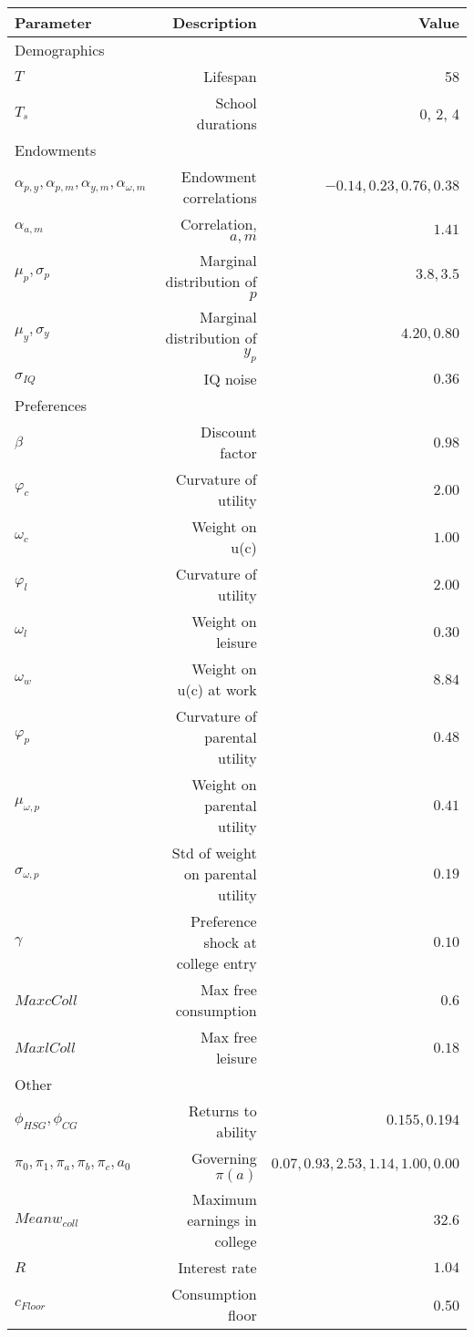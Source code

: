 \begin{tabular}{lrr}
\hline
Parameter & Description  & Value  \\ 
\hline
Demographics &   &   \\ 
$T$ & Lifespan  & 58  \\ 
$T_{s}$ & School durations  & 0, 2, 4  \\ 
Endowments &   &   \\ 
$\alpha_{p,y}, \alpha_{p,m}, \alpha_{y,m}, \alpha_{\omega,m}$ & Endowment correlations  & $-0.14, 0.23, 0.76, 0.38$  \\ 
$\alpha_{a,m}$ & Correlation, $a,m$  & $1.41$  \\ 
$\mu_{p}, \sigma_{p}$ & Marginal distribution of $p$  & $3.8, 3.5$  \\ 
$\mu_{y}, \sigma_{y}$ & Marginal distribution of $y_{p}$  & $4.20, 0.80$  \\ 
$\sigma_{IQ}$ & IQ noise  & $0.36$  \\ 
Preferences &   &   \\ 
$\beta$ & Discount factor  & $0.98$  \\ 
$\varphi_{c}$ & Curvature of utility  & $2.00$  \\ 
$\omega_{c}$ & Weight on u(c)  & $1.00$  \\ 
$\varphi_{l}$ & Curvature of utility  & $2.00$  \\ 
$\omega_{l}$ & Weight on leisure  & $0.30$  \\ 
$\omega_{w}$ & Weight on u(c) at work  & $8.84$  \\ 
$\varphi_{p}$ & Curvature of parental utility  & $0.48$  \\ 
$\mu_{\omega,p}$ & Weight on parental utility  & $0.41$  \\ 
$\sigma_{\omega,p}$ & Std of weight on parental utility  & $0.19$  \\ 
$\gamma$ & Preference shock at college entry  & $0.10$  \\ 
$Max cColl$ & Max free consumption  & $0.6$  \\ 
$Max lColl$ & Max free leisure  & $0.18$  \\ 
Other &   &   \\ 
$\phi_{HSG}, \phi_{CG}$ & Returns to ability  & $0.155, 0.194$  \\ 
$\pi_{0}, \pi_{1}, \pi_{a}, \pi_{b}, \pi_{c}, a_{0}$ & Governing $\pi(a)$  & $0.07, 0.93, 2.53, 1.14, 1.00, 0.00$  \\ 
$Mean w_{coll}$ & Maximum earnings in college  & $32.6$  \\ 
$R$ & Interest rate  & $1.04$  \\ 
$c_{Floor}$ & Consumption floor  & 0.50  \\ 
\hline
\end{tabular}%
